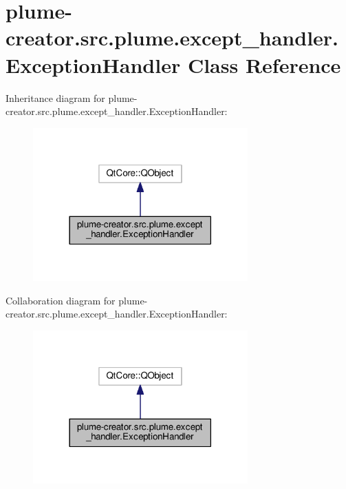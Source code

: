 \hypertarget{classplume-creator_1_1src_1_1plume_1_1except__handler_1_1_exception_handler}{}\section{plume-\/creator.src.\+plume.\+except\+\_\+handler.\+Exception\+Handler Class Reference}
\label{classplume-creator_1_1src_1_1plume_1_1except__handler_1_1_exception_handler}


Inheritance diagram for plume-\/creator.src.\+plume.\+except\+\_\+handler.\+Exception\+Handler\+:\nopagebreak
\begin{figure}[H]
\begin{center}
\leavevmode
\includegraphics[width=234pt]{classplume-creator_1_1src_1_1plume_1_1except__handler_1_1_exception_handler__inherit__graph}
\end{center}
\end{figure}


Collaboration diagram for plume-\/creator.src.\+plume.\+except\+\_\+handler.\+Exception\+Handler\+:\nopagebreak
\begin{figure}[H]
\begin{center}
\leavevmode
\includegraphics[width=234pt]{classplume-creator_1_1src_1_1plume_1_1except__handler_1_1_exception_handler__coll__graph}
\end{center}
\end{figure}
